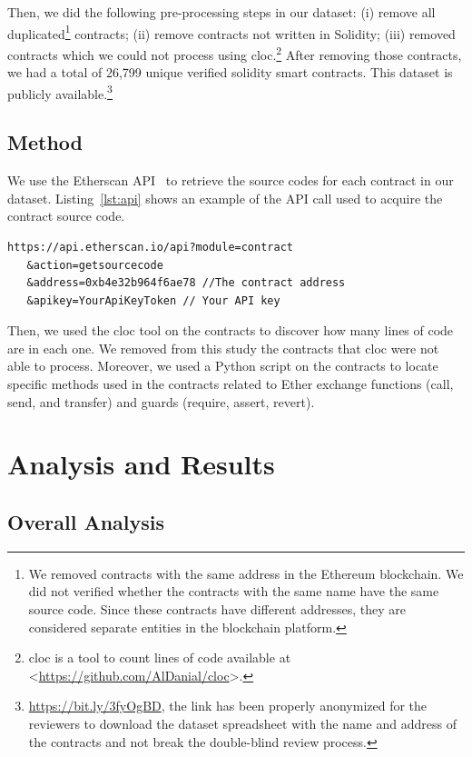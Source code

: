 \documentclass[10pt,conference]{IEEEtran}
\newcommand{\totalContracts}{26,799\xspace}
\begin{document}
Then, we did the following pre-processing steps in our dataset: (i) remove all duplicated\footnote{We removed contracts with the same address in the Ethereum blockchain. We did not verified whether the contracts with the same name have the same source code. Since these contracts have different addresses, they are considered separate entities in the blockchain platform.} contracts; (ii) remove contracts not written in Solidity; (iii) removed contracts which we could not process using cloc.\footnote{cloc is a tool to count lines of code available at <\url{https://github.com/AlDanial/cloc}>.} After removing those contracts, we had a total of \totalContracts unique verified solidity smart contracts. This dataset is publicly available.\footnote{\url{https://bit.ly/3fyOgBD}, the link has been properly anonymized for the reviewers to download the dataset spreadsheet with the name and address of the contracts and not break the double-blind review process.} 


\subsection{Method}

We use the Etherscan API~\cite{etherscan_api} to retrieve the source codes for each contract in our dataset. Listing~\ref{lst:api} shows an example of the API call used to acquire the contract source code. 
\begin{lstlisting}[language=solidity, caption=Etherscan API call, label={lst:api}]
https://api.etherscan.io/api?module=contract
   &action=getsourcecode
   &address=0xb4e32b964f6ae78 //The contract address
   &apikey=YourApiKeyToken // Your API key
\end{lstlisting}

Then, we used the cloc tool on the contracts to discover how many lines of code are in each one.  We removed from this study the contracts that cloc were not able to process. Moreover, we used a Python script on the contracts to locate specific methods used in the contracts related to Ether exchange functions (call, send, and transfer) and guards (require, assert, revert).

\section{Analysis and Results}

\subsection{Overall Analysis}
\end{document}
